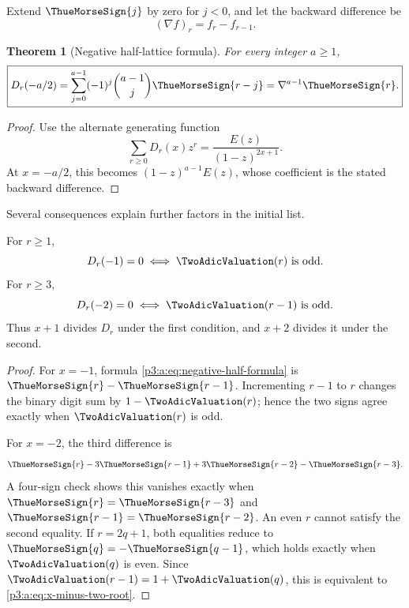 \documentclass[11pt,oneside]{article}
\numberwithin{equation}{section}
\newtheorem{theorem}{Theorem}[section]
\theoremstyle{definition}
\theoremstyle{remark}
\begin{document}
Extend \(\ThueMorseSign{j}\) by zero for \(j<0\), and let the backward difference be
\begin{equation}
 (\nabla f)_r=f_r-f_{r-1}.
 \label{p3:a:eq:backward-difference}
\end{equation}

\begin{theorem}[Negative half-lattice formula]\label{p3:a:thm:negative-half}
For every integer \(a\ge1\),
\begin{equation}
 \boxed{
 D_r(-a/2)
 =\sum_{j=0}^{a-1}(-1)^j\binom{a-1}{j}\ThueMorseSign{r-j}
 =\nabla^{a-1}\ThueMorseSign{r}.}
 \label{p3:a:eq:negative-half-formula}
\end{equation}
\end{theorem}

\begin{proof}
Use the alternate generating function
\[
 \sum_{r\ge0}D_r(x)z^r
 =\frac{E(z)}{(1-z)^{2x+1}}.
\]
At \(x=-a/2\), this becomes \((1-z)^{a-1}E(z)\), whose coefficient is the
stated backward difference.
\end{proof}

Several consequences explain further factors in the initial list.

\begin{corollary}\label{p3:a:cor:valuation-roots}
For \(r\ge1\),
\begin{equation}
 D_r(-1)=0
 \iff \TwoAdicValuation(r)\text{ is odd}.
 \label{p3:a:eq:x-minus-one-root}
\end{equation}
For \(r\ge3\),
\begin{equation}
 D_r(-2)=0
 \iff \TwoAdicValuation(r-1)\text{ is odd}.
 \label{p3:a:eq:x-minus-two-root}
\end{equation}
Thus \(x+1\) divides \(D_r\) under the first condition, and \(x+2\)
divides it under the second.
\end{corollary}

\begin{proof}
For \(x=-1\), formula \eqref{p3:a:eq:negative-half-formula} is
\(\ThueMorseSign{r}-\ThueMorseSign{r-1}\).  Incrementing \(r-1\) to \(r\) changes the binary
digit sum by \(1-\TwoAdicValuation(r)\); hence the two signs agree exactly when
\(\TwoAdicValuation(r)\) is odd.

For \(x=-2\), the third difference is
\[
 \ThueMorseSign{r}-3\ThueMorseSign{r-1}+3\ThueMorseSign{r-2}-\ThueMorseSign{r-3}.
\]
A four-sign check shows this vanishes exactly when
\(\ThueMorseSign{r}=\ThueMorseSign{r-3}\) and \(\ThueMorseSign{r-1}=\ThueMorseSign{r-2}\).  An even \(r\) cannot
satisfy the second equality.  If \(r=2q+1\), both equalities reduce to
\(\ThueMorseSign{q}=-\ThueMorseSign{q-1}\), which holds exactly when \(\TwoAdicValuation(q)\) is even.
Since \(\TwoAdicValuation(r-1)=1+\TwoAdicValuation(q)\), this is equivalent to
\eqref{p3:a:eq:x-minus-two-root}.
\end{proof}
\end{document}
